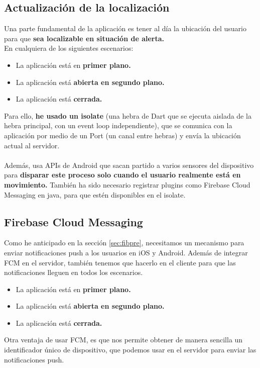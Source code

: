 \subsection{Actualización de la localización}
Una parte fundamental de la aplicación es tener al día la ubicación del usuario para que \textbf{sea localizable en situación de alerta.} \\

En cualquiera de los siguientes escenarios:
\begin{itemize}
	\item La aplicación está en \textbf{primer plano.}
	\item La aplicación está \textbf{abierta en segundo plano.}
	\item La aplicación está \textbf{cerrada.}
\end{itemize}

Para ello, \textbf{he usado un isolate} (una hebra de Dart que se ejecuta aislada de la hebra principal, con un event loop independiente), que se comunica con la aplicación por medio de un Port (un canal entre hebras) y envía la ubicación actual al servidor. \\ \\
Además, usa APIs de Android que sacan partido a varios sensores del dispositivo para \textbf{disparar este 
proceso solo cuando el usuario realmente está en movimiento.}
También ha sido necesario registrar plugins como Firebase Cloud Messaging en java, para que estén disponibles en el isolate.

\subsection{Firebase Cloud Messaging}\label{sec:fib}
Como he anticipado en la sección \ref{sec:fibpre}, necesitamos un mecanismo para enviar notificaciones push a los usuarios en iOS y Android.
Además de integrar FCM en el servidor, también tenemos que hacerlo en el cliente para que las notificaciones lleguen en todos los escenarios.

\begin{itemize}
	\item La aplicación está en \textbf{primer plano.}
	\item La aplicación está \textbf{abierta en segundo plano.}
	\item La aplicación está \textbf{cerrada.}
\end{itemize}


Otra ventaja de usar FCM, es que nos permite obtener de manera sencilla un identificador único de dispositivo, que podemos usar en el servidor para enviar las notificaciones push.

